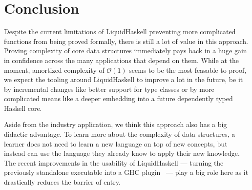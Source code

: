 \documentclass[sigplan,screen]{acmart}
\renewcommand\O[1]{$\mathcal{O}(#1)$}
\begin{document}
\section{Conclusion}

Despite the current limitations of LiquidHaskell preventing more complicated functions from being proved formally, there is still a lot of value in this approach. Proving complexity of core data structures immediately pays back in a huge gain in confidence across the many applications that depend on them. While at the moment, amortized complexity of \O{1} seems to be the most feasable to proof, we expect the tooling around LiquidHaskell to improve a lot in the future, be it by incremental changes like better support for type classes or by more complicated means like a deeper embedding into a future dependently typed Haskell core.

Aside from the industry application, we think this approach also has a big didactic advantage. To learn more about the complexity of data structures, a learner does not need to learn a new language on top of new concepts, but instead can use the language they already know to apply their new knowledge. The recent improvements in the usability of LiquidHaskell --- turning the previously standalone executable into a GHC plugin~\cite{lh_plugin} --- play a big role here as it drastically reduces the barrier of entry.





\appendix
\end{document}
